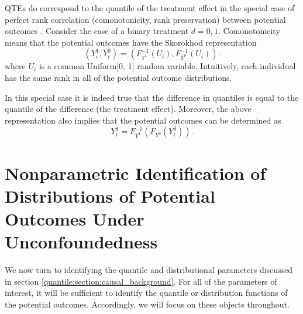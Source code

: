QTEs do correspond to the quantile of the treatment effect in the special case of perfect rank correlation (comonotonicity, rank preservation) between potential outcomes \citep{Doksum1974EmpiricalProbabilityPlots}. Consider the case of a binary treatment $d=0, 1$. 
%
Comonotonicity means that the potential outcomes have the Skorokhod representation
\begin{equation}
	(Y^1_i, Y^0_i) = \left(F_{Y^1}^{-1}(U_i), F_{Y^0}^{-1}(U_i)\right).
\end{equation}
where $U_i$ is a common Uniform[0, 1] random variable. Intuitively, each individual has the same rank in all of the potential outcome distributions.
% 

In this special case it is indeed true that the difference in quantiles is equal to the quantile of the difference (the treatment effect). Moreover, the above representation also implies that the potential outcomes can be determined as 
\begin{equation}
	Y^1_i = F_{Y^1}^{-1}\left( F_{Y^0} (Y^0_i) \right).
\end{equation}
%


% 
% 
 \newpage 
 
  

\section{Nonparametric Identification of Distributions of Potential Outcomes Under Unconfoundedness}
 \label{quantile:section:identification_qtes_dtes_unconfounded} 
  
 We now turn to  identifying the quantile and distributional parameters discussed in section \ref{quantile:section:causal_background}.
%
For all of the parameters of interest,  it will be sufficient to identify the quantile or distribution functions of the potential outcomes. Accordingly, we will focus on these objects throughout.

